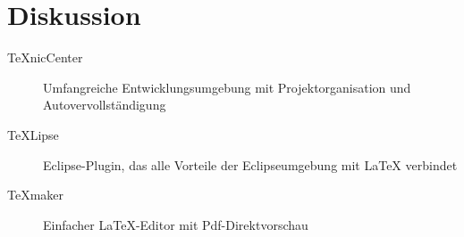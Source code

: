 \chapter{Diskussion}

\begin{description}
	\item [TeXnicCenter] Umfangreiche Entwicklungsumgebung mit Projektorganisation und Autovervollständigung
	\item [TeXLipse] Eclipse-Plugin, das alle Vorteile der Eclipseumgebung mit LaTeX verbindet
	\item [TeXmaker] Einfacher LaTeX-Editor mit Pdf-Direktvorschau
\end{description}